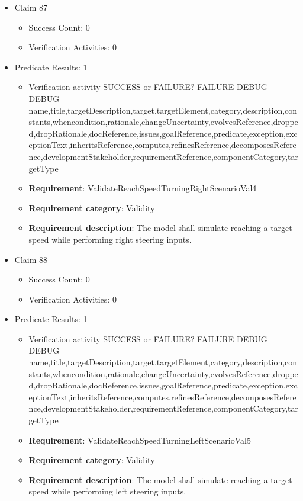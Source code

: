 \documentclass{article}
\begin{document}
\begin{itemize}
  				  \item Claim 87
				\begin{itemize}
			    	\item Success Count: 0 
			    	\item Verification Activities: 0
				\end{itemize}
				
									    
				\item Predicate Results: 1
					\begin{itemize}				
					\item Verification activity SUCCESS or FAILURE? FAILURE
					DEBUG DEBUG name,title,targetDescription,target,targetElement,category,description,constants,whencondition,rationale,changeUncertainty,evolvesReference,dropped,dropRationale,docReference,issues,goalReference,predicate,exception,exceptionText,inheritsReference,computes,refinesReference,decomposesReference,developmentStakeholder,requirementReference,componentCategory,targetType
					\item \textbf{Requirement}: ValidateReachSpeedTurningRightScenarioVal4 
					\item \textbf{Requirement category}: Validity
					\item \textbf{Requirement description}: The model shall simulate reaching a target speed while performing right steering inputs.
					\end{itemize}

  				  \item Claim 88
				\begin{itemize}
			    	\item Success Count: 0 
			    	\item Verification Activities: 0
				\end{itemize}
				
									    
				\item Predicate Results: 1
					\begin{itemize}				
					\item Verification activity SUCCESS or FAILURE? FAILURE
					DEBUG DEBUG name,title,targetDescription,target,targetElement,category,description,constants,whencondition,rationale,changeUncertainty,evolvesReference,dropped,dropRationale,docReference,issues,goalReference,predicate,exception,exceptionText,inheritsReference,computes,refinesReference,decomposesReference,developmentStakeholder,requirementReference,componentCategory,targetType
					\item \textbf{Requirement}: ValidateReachSpeedTurningLeftScenarioVal5 
					\item \textbf{Requirement category}: Validity
					\item \textbf{Requirement description}: The model shall simulate reaching a target speed while performing left steering inputs.
					\end{itemize}


\end{itemize}
\end{document}
